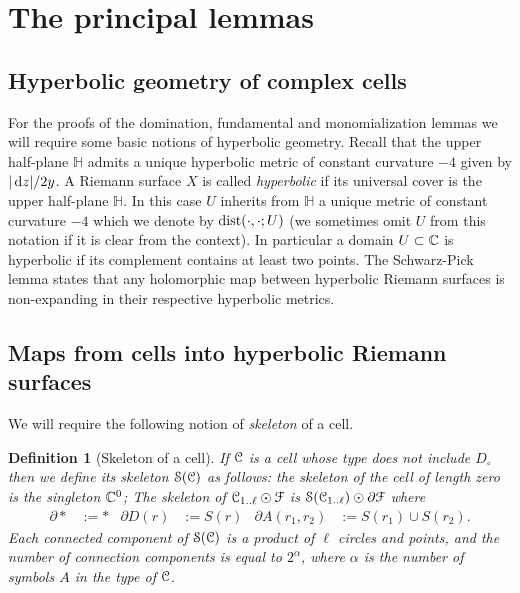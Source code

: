 \documentclass[reqno]{amsart}
\newtheorem{Def}[Cor]{Definition}{\bfseries}{\rmfamily}
\renewcommand\~[1]{\widetilde{#1}}
\def\H{{\mathbb H}}
\def\cF{{\mathcal F}} \def\cL{{\mathcal L}} \def\cR{{\mathcal R}}
\def\cS{{\mathcal S}} \def\cSc{{\mathcal S \mathcal C}}
\begin{document}
\section{The principal lemmas}
\label{sec:fund-lemmas}

\subsection{Hyperbolic geometry of complex cells}

For the proofs of the domination, fundamental and monomialization
lemmas we will require some basic notions of hyperbolic
geometry. Recall that the upper half-plane $\H$ admits a unique
hyperbolic metric of constant curvature $-4$ given by $|\,\mathrm d z|/2y$. A
Riemann surface $X$ is called \emph{hyperbolic} if its universal cover
is the upper half-plane $\H$. In this case $U$ inherits from $\H$ a
unique metric of constant curvature $-4$ which we denote by
$\operatorname{dist}(\cdot,\cdot;U)$ (we sometimes omit $U$ from this notation if it
is clear from the context). In particular a domain $U\subset{\mathbb C}$ is
hyperbolic if its complement contains at least two points. The
Schwarz-Pick lemma states that any holomorphic map between hyperbolic
Riemann surfaces is non-expanding in their respective hyperbolic
metrics.

\subsection{Maps from cells into hyperbolic Riemann surfaces}

We will require the following notion of \emph{skeleton} of a cell.

\begin{Def}[Skeleton of a cell]
  If ${\mathcal C}$ is a cell whose type does not include $D_\circ$ then we
  define its \emph{skeleton} $\cS(\cC)$ as follows: the skeleton of
  the cell of length zero is the singleton ${\mathbb C}^0$; The skeleton of
  $\cC_{1..\ell}\odot \cF$ is $\cS(\cC_{1..\ell})\odot \partial\cF$
  where
  \begin{align}
    \partial*&:=* & \partial D(r) &:= S(r) & \partial A(r_1,r_2)&:=
                                                                  S(r_1)\cup S(r_2).
  \end{align}
  Each connected component of $\cS(\cC)$ is a product of $\ell$ circles
  and points, and the number of connection components is equal to
  $2^\alpha$, where $\alpha$ is the number of symbols $A$ in the type of
  ${\mathcal C}$.
\end{Def}
\end{document}
